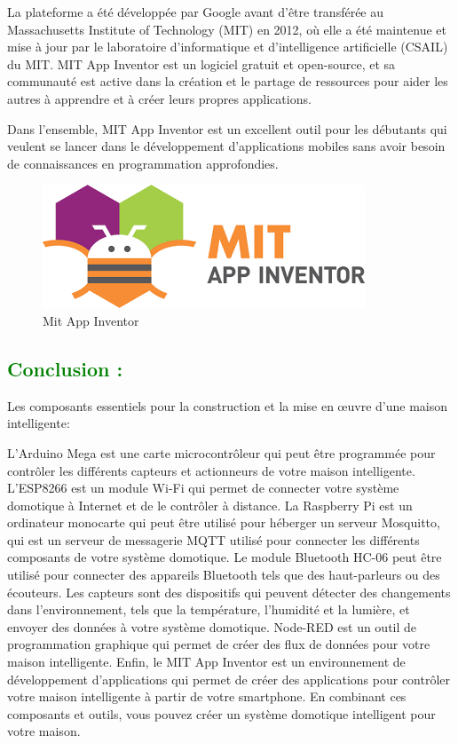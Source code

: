 \begin{flushleft}
	La plateforme a été développée par Google avant d'être transférée au Massachusetts Institute of Technology (MIT) en 2012, où elle a été maintenue et mise à jour par le laboratoire d'informatique et d'intelligence artificielle (CSAIL) du MIT. MIT App Inventor est un logiciel gratuit et open-source, et sa communauté est active dans la création et le partage de ressources pour aider les autres à apprendre et à créer leurs propres applications.
	
	Dans l'ensemble, MIT App Inventor est un excellent outil pour les débutants qui veulent se lancer dans le développement d'applications mobiles sans avoir besoin de connaissances en programmation approfondies.
	\begin{figure}[h]
		\centering
		\includegraphics{chapitres/images/AppInventor.png}
		\caption{Mit App Inventor}
		\label{fig:labelname}
	\end{figure}
	\subsection{\textcolor{green}{Conclusion :}}
	Les composants  essentiels pour la construction et la mise en œuvre d'une maison intelligente: 
	
	L'Arduino Mega est une carte microcontrôleur qui peut être programmée pour contrôler les différents capteurs et actionneurs de votre maison intelligente. L'ESP8266 est un module Wi-Fi qui permet de connecter votre système domotique à Internet et de le contrôler à distance. La Raspberry Pi est un ordinateur monocarte qui peut être utilisé pour héberger un serveur Mosquitto, qui est un serveur de messagerie MQTT utilisé pour connecter les différents composants de votre système domotique. Le module Bluetooth HC-06 peut être utilisé pour connecter des appareils Bluetooth tels que des haut-parleurs ou des écouteurs. Les capteurs sont des dispositifs qui peuvent détecter des changements dans l'environnement, tels que la température, l'humidité et la lumière, et envoyer des données à votre système domotique. Node-RED est un outil de programmation graphique qui permet de créer des flux de données pour votre maison intelligente. Enfin, le MIT App Inventor est un environnement de développement d'applications qui permet de créer des applications pour contrôler votre maison intelligente à partir de votre smartphone. En combinant ces composants et outils, vous pouvez créer un système domotique intelligent pour votre maison.
	\newpage
\end{flushleft}
